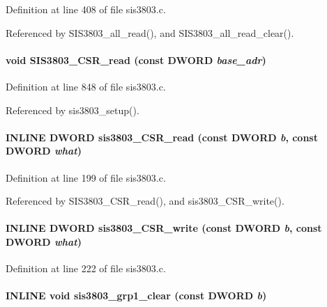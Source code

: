 Definition at line 408 of file sis3803.c.

Referenced by SIS3803\_\-all\_\-read(), and SIS3803\_\-all\_\-read\_\-clear().
\paragraph[{SIS3803\_\-CSR\_\-read}]{\setlength{\rightskip}{0pt plus 5cm}void SIS3803\_\-CSR\_\-read (const {\bf DWORD} {\em base\_\-adr})}\hfill\label{sis3803_8h_afa74b8645c6fc7aa512834be5f367cd8}


Definition at line 848 of file sis3803.c.

Referenced by sis3803\_\-setup().
\paragraph[{sis3803\_\-CSR\_\-read}]{\setlength{\rightskip}{0pt plus 5cm}INLINE {\bf DWORD} sis3803\_\-CSR\_\-read (const {\bf DWORD} {\em b}, \/  const {\bf DWORD} {\em what})}\hfill\label{sis3803_8h_a8c2c4eabc48a0e7c5f7791cd851ab492}


Definition at line 199 of file sis3803.c.

Referenced by SIS3803\_\-CSR\_\-read(), and sis3803\_\-CSR\_\-write().
\paragraph[{sis3803\_\-CSR\_\-write}]{\setlength{\rightskip}{0pt plus 5cm}INLINE {\bf DWORD} sis3803\_\-CSR\_\-write (const {\bf DWORD} {\em b}, \/  const {\bf DWORD} {\em what})}\hfill\label{sis3803_8h_a939320a6301d619598686286fa62de86}


Definition at line 222 of file sis3803.c.
\paragraph[{sis3803\_\-grp1\_\-clear}]{\setlength{\rightskip}{0pt plus 5cm}INLINE void sis3803\_\-grp1\_\-clear (const {\bf DWORD} {\em b})}\hfill\label{sis3803_8h_ac03a2dcb0c29892b4d0366b67afe756f}


